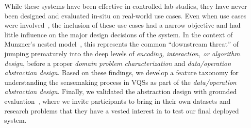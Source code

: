 \par While these systems have been effective in controlled lab studies, they have never been designed and evaluated in-situ on real-world use cases. Even when use cases were involved~\cite{Hochheiser2004,correll2016semantics}, the inclusion of these use cases had a narrow objective and had little influence on the major design decisions of the system. In the context of Munzner's nested model~\cite{munzner2009nested}, this represents the common ``downstream threat'' of jumping prematurely into the deep levels of \textit{encoding, interaction, or algorithm design}, before a proper \textit{domain problem characterization} and \textit{data/operation abstraction design}.  Based on these findings, we develop a feature taxonomy for understanding the sensemaking process in VQSs as part of the \textit{data/operation abstraction design}. Finally, we validated the abstraction design with grounded evaluation~\cite{Plaisant2004,Isenberg2008}, where we invite participants to bring in their own datasets and research problems that they have a vested interest in to test our final deployed system. 
